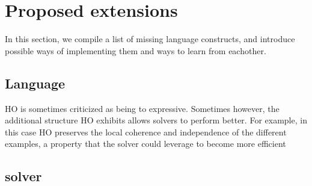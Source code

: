 \section{Proposed extensions}\label{sec:extension}
In this section, we compile a list of missing language constructs, and introduce possible ways of implementing them and ways to learn from eachother.
\subsection{Language}
HO is sometimes criticized as being to expressive.
Sometimes however, the additional structure HO exhibits allows solvers to perform better.
For example, in this case HO preserves the local coherence and independence of the different examples, a property that the solver could leverage to become more efficient
\subsection{solver}

